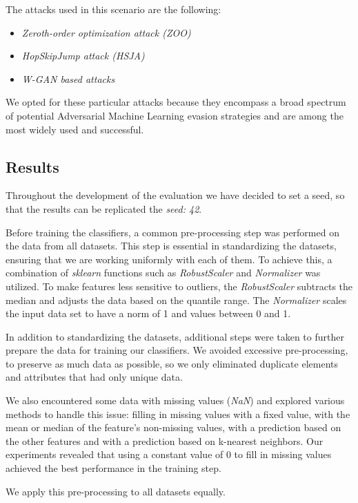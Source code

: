 The attacks used in this scenario are the following:

\begin{itemize}
    \item \textit{Zeroth-order optimization attack (ZOO)}
    \item \textit{HopSkipJump attack (HSJA)}
    \item \textit{W-GAN based attacks}
\end{itemize}

We opted for these particular attacks because they encompass a broad spectrum of potential Adversarial Machine Learning
evasion strategies and are among the most widely used and successful.

\subsection{Results}

Throughout the development of the evaluation we have decided to set a seed, so that the results can be replicated the \textit{seed: 42}.

Before training the classifiers, a common pre-processing step was performed on the data from all datasets.
This step is essential in standardizing the datasets, ensuring that we are working uniformly with each of them.
To achieve this, a combination of \textit{sklearn} functions such as \textit{RobustScaler} and \textit{Normalizer}
was utilized.
To make features less sensitive to outliers, the \textit{RobustScaler} subtracts the median and adjusts the data based on the quantile range.
The \textit{Normalizer} scales the input data set to have a norm of 1 and values between 0 and 1.

In addition to standardizing the datasets, additional steps were taken to further prepare the data for training our
classifiers. We avoided excessive pre-processing, to preserve as much data as possible, so we only eliminated duplicate elements and attributes that had only unique data.

We also encountered some data with missing values (\textit{NaN}) and explored various methods to handle this issue:
filling in missing values with a fixed value, with the mean or median of the feature's non-missing values,
with a prediction based on the other features and with a prediction based on k-nearest neighbors.
Our experiments revealed that using a constant value of 0 to fill in missing values achieved the best performance in the training step.

We apply this pre-processing to all datasets equally.

